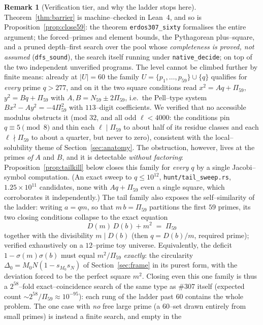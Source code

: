 \documentclass[11pt]{article}
\theoremstyle{definition}
\newtheorem{remark}[theorem]{Remark}
\begin{document}
\begin{remark}[Verification tier, and why the ladder stops here]\label{rem:tier60}
Theorem~\ref{thm:barrier} is machine--checked in Lean~4, and so is
Proposition~\ref{prop:close59}: the theorem \texttt{erdos307\_sixty} formalises the entire
argument; the forced--primes and element bounds, the Pythagorean plus--square, and a pruned
depth--first search over the pool whose \emph{completeness is proved, not assumed}
(\texttt{dfs\_sound}), the search itself running under \texttt{native\_decide}; on top of the
two independent unverified programs. The level cannot be climbed further by finite means: already at $|U|=60$ the family
$U=\{p_1,\dots,p_{59}\}\cup\{q\}$ qualifies for \emph{every} prime $q>277$, and on it the two square
conditions read $x^2=Aq+\Pi_{59}$, $y^2=Bq+\Pi_{59}$ with $A,B=N_{59}\pm2\Pi_{59}$, i.e.\ the
Pell--type system $Bx^2-Ay^2=-4\Pi_{59}^2$ with $113$--digit coefficients. We verified that no
accessible modulus obstructs it (mod $32$, and all odd $\ell<4000$: the conditions pin
$q\equiv5\pmod 8$ and thin each $\ell\mid\Pi_{59}$ to about half of its residue classes and each
$\ell\nmid\Pi_{59}$ to about a quarter, but never to zero), consistent with the local--solubility
theme of Section~\ref{sec:anatomy}. The obstruction, however, lives at the primes \emph{of} $A$
and $B$, and it is detectable \emph{without factoring}: Proposition~\ref{prop:tailkill} below
closes this family for \emph{every} $q$ by a single Jacobi--symbol computation. (An exact sweep to
$q\le10^{12}$, \texttt{hunt/tail\_sweep.rs}, $1.25\times10^{11}$ candidates, none with
$Aq+\Pi_{59}$ even a single square, which corroborates it independently.) The tail family also exposes the self--similarity of the ladder:
writing $a=qm$, so that $m\,b=\Pi_{59}$ partitions the first $59$ primes, its two closing
conditions collapse to the exact equation
\[ D(m)\,D(b)+m^2\;=\;\Pi_{59} \]
together with the divisibility $m\mid D(b)$ (then $q=D(b)/m$, required prime); verified
exhaustively on a $12$--prime toy universe. Equivalently, the deficit $1-\sigma(m)\sigma(b)$ must
equal $m^2/\Pi_{59}$ \emph{exactly}: the circularity $\Delta_0=M_0N(1-s_{M_0}s_N)$ of
Section~\ref{sec:frame} in its purest form, with the deviation forced to be the perfect square
$m^2$. Closing even this one family is thus a $2^{58}$--fold exact--coincidence search of the same
type as \#307 itself (expected count ${\sim}2^{58}/\Pi_{59}\approx10^{-95}$): each rung of the
ladder past $60$ contains the whole problem. The one case with \emph{no} free large prime (a
$60$--set drawn entirely from small primes) is instead a finite search, and empty in the

\end{remark}
\end{document}

